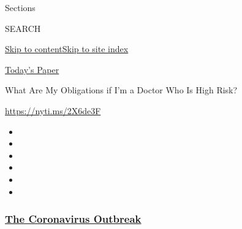 Sections

SEARCH

\protect\hyperlink{site-content}{Skip to
content}\protect\hyperlink{site-index}{Skip to site index}

\href{https://myaccount.nytimes3xbfgragh.onion/auth/login?response_type=cookie\&client_id=vi}{}

\href{https://www.nytimes3xbfgragh.onion/section/todayspaper}{Today's
Paper}

What Are My Obligations if I'm a Doctor Who Is High Risk?

\url{https://nyti.ms/2X6de3F}

\begin{itemize}
\item
\item
\item
\item
\item
\item
\end{itemize}

\hypertarget{the-coronavirus-outbreak}{%
\subsubsection{\texorpdfstring{\href{https://www.nytimes3xbfgragh.onion/news-event/coronavirus?name=styln-coronavirus-national\&region=TOP_BANNER\&block=storyline_menu_recirc\&action=click\&pgtype=Article\&impression_id=695e0320-f1cd-11ea-a3e0-dfa223dac892\&variant=undefined}{The
Coronavirus
Outbreak}}{The Coronavirus Outbreak}}\label{the-coronavirus-outbreak}}

